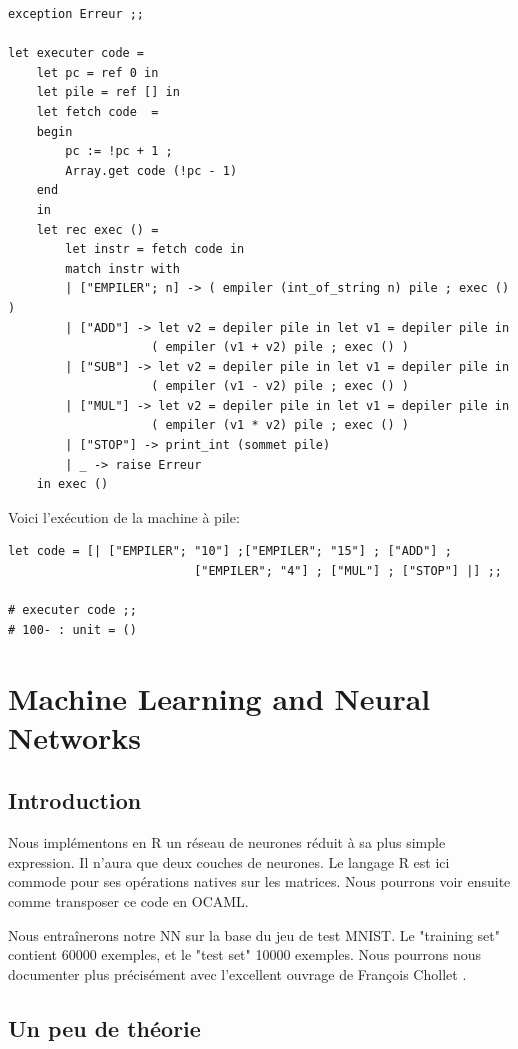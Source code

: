 \documentclass[11pt]{book}
\begin{document}
\begin{Verbatim}
exception Erreur ;;
	
let executer code =
	let pc = ref 0 in
	let pile = ref [] in
	let fetch code  =
	begin
		pc := !pc + 1 ; 
		Array.get code (!pc - 1) 
	end 
	in
	let rec exec () =
		let instr = fetch code in
		match instr with
		| ["EMPILER"; n] -> ( empiler (int_of_string n) pile ; exec () )
		| ["ADD"] -> let v2 = depiler pile in let v1 = depiler pile in 
		            ( empiler (v1 + v2) pile ; exec () )
		| ["SUB"] -> let v2 = depiler pile in let v1 = depiler pile in
		            ( empiler (v1 - v2) pile ; exec () )
		| ["MUL"] -> let v2 = depiler pile in let v1 = depiler pile in
		            ( empiler (v1 * v2) pile ; exec () )
		| ["STOP"] -> print_int (sommet pile)
		| _ -> raise Erreur
	in exec ()
\end{Verbatim}

Voici l'exécution de la machine à pile:
\begin{Verbatim}
let code = [| ["EMPILER"; "10"] ;["EMPILER"; "15"] ; ["ADD"] ;
						  ["EMPILER"; "4"] ; ["MUL"] ; ["STOP"] |] ;;
						  
# executer code ;;
# 100- : unit = ()
\end{Verbatim}

\section{Machine Learning and Neural Networks}

\subsection{Introduction}

Nous implémentons en R un réseau de neurones réduit à sa plus simple expression.
Il n'aura que deux couches de neurones.
Le langage R est ici commode pour ses opérations natives sur les matrices.
Nous pourrons voir ensuite comme transposer ce code en OCAML.

Nous entraînerons notre NN sur la base du jeu de test MNIST.
Le  "training set" contient 60000 exemples, et le "test set" 10000 exemples.
Nous pourrons nous documenter plus précisément avec l'excellent ouvrage de François Chollet \cite{deepR}.

\subsection{Un peu de théorie}
\end{document}
